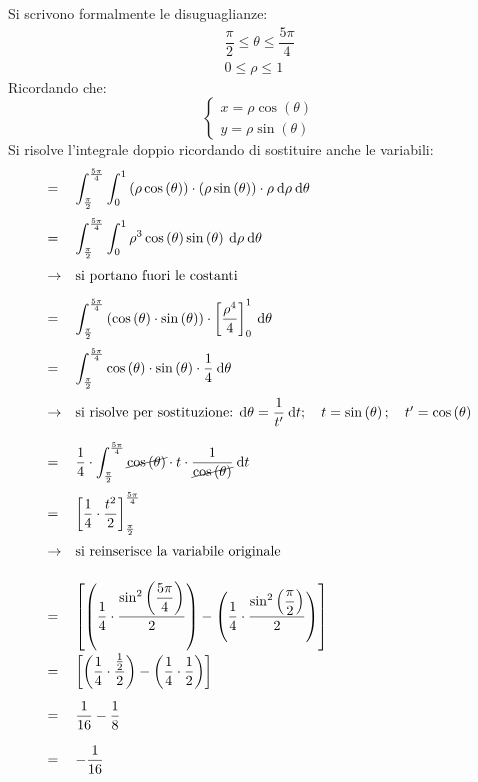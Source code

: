 \documentclass[a4paper]{article}
\begin{document}
	\noindent
	Si scrivono formalmente le disuguaglianze:
	\begin{gather*}
		\dfrac{\pi}{2} \le \theta \le \dfrac{5\pi}{4} \\
		0 \le \rho \le 1
	\end{gather*}
	Ricordando che:
	\begin{equation*}
		\begin{cases}
			x = \rho \cos\left(\theta\right) \\
			y = \rho \sin\left(\theta\right)
		\end{cases}
	\end{equation*}
	Si risolve l'integrale doppio ricordando di sostituire anche le variabili:
	\begin{equation*}
		\begin{array}{ll}
			=& \displaystyle\int_{\frac{\pi}{2}}^{\frac{5\pi}{4}} \int_{0}^{1} \left(\rho\cos\left(\theta\right)\right) \cdot \left(\rho\sin\left(\theta\right)\right) \cdot \rho \: \mathrm{d}\rho \: \mathrm{d}\theta \\ [1.5em]
			=& \displaystyle\int_{\frac{\pi}{2}}^{\frac{5\pi}{4}} \int_{0}^{1} \rho^{3}\cos\left(\theta\right) \sin\left(\theta\right) \: \mathrm{d}\rho \: \mathrm{d}\theta \\ [1.5em]
			\rightarrow& \text{si portano fuori le costanti} \\ [1em]
			=& \displaystyle\int_{\frac{\pi}{2}}^{\frac{5\pi}{4}} \left(\cos\left(\theta\right) \cdot \sin\left(\theta\right)\right) \cdot \left[\dfrac{\rho^{4}}{4}\right]_{0}^{1} \: \mathrm{d}\theta \\ [1.5em]
			=& \displaystyle\int_{\frac{\pi}{2}}^{\frac{5\pi}{4}} \cos\left(\theta\right) \cdot \sin\left(\theta\right) \cdot \dfrac{1}{4} \: \mathrm{d}\theta \\ [1.5em]
			\rightarrow& \text{si risolve per sostituzione: }\mathrm{d}\theta = \dfrac{1}{t'} \: \mathrm{d}t; \hspace{1em} t = \sin\left(\theta\right); \hspace{1em} t'=\cos\left(\theta\right) \\ [1.5em]
			=& \dfrac{1}{4} \cdot \displaystyle\int_{\frac{\pi}{2}}^{\frac{5\pi}{4}} \cancel{\cos\left(\theta\right)} \cdot t \cdot \dfrac{1}{\cancel{\cos\left(\theta\right)}} \: \mathrm{d}t \\ [1.5em]
			=& \left[\dfrac{1}{4} \cdot \dfrac{t^{2}}{2}\right]_{\frac{\pi}{2}}^{\frac{5\pi}{4}} \\ [1.5em]
			\rightarrow& \text{si reinserisce la variabile originale} \\ [1.5em]
			=& \left[\left(\dfrac{1}{4} \cdot \dfrac{\sin^{2}\left(\dfrac{5\pi}{4}\right)}{2}\right) - \left(\dfrac{1}{4} \cdot \dfrac{\sin^{2}\left(\dfrac{\pi}{2}\right)}{2}\right)\right] \\ [2em]
			=& \left[\left(\dfrac{1}{4} \cdot \dfrac{\frac{1}{2}}{2}\right) - \left(\dfrac{1}{4} \cdot \dfrac{1}{2}\right)\right] \\ [1.5em]
			=& \dfrac{1}{16} - \dfrac{1}{8} \\ [1.5em]
			=& -\dfrac{1}{16}
		\end{array}
	\end{equation*}\newpage
\end{document}
